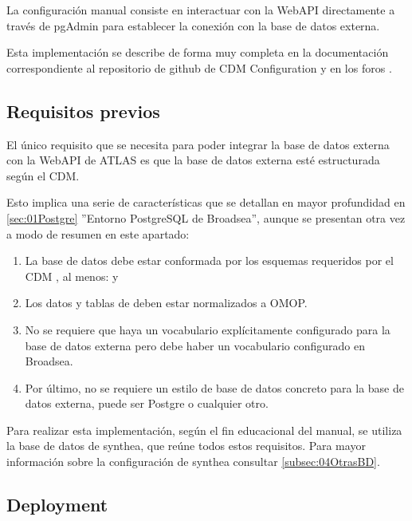 La configuración manual consiste en interactuar con la WebAPI directamente a través de pgAdmin para establecer la conexión con la base de datos externa. 

Esta implementación se describe de forma muy completa en la documentación correspondiente al repositorio de github de CDM Configuration \parencite{githubCDMConfig} y en los foros \parencite{forumAddMSDB}\parencite{forumBroadQuickStart}.

\subsection{Requisitos previos} \label{subsec:04RequisitosPrevios}

El único requisito que se necesita para poder integrar la base de datos externa con la WebAPI de ATLAS es que la base de datos externa esté estructurada según el CDM.

Esto implica una serie de características que se detallan en mayor profundidad en \ref{sec:01Postgre} ''Entorno PostgreSQL de Broadsea'', aunque se presentan otra vez a modo de resumen en este apartado:

\begin{enumerate}
    \item La base de datos debe estar conformada por los esquemas requeridos por el CDM \parencite{githubCDMConfig}, al menos:  y 
    \item Los datos y tablas de  deben estar normalizados a OMOP.
    \item No se requiere que haya un vocabulario explícitamente configurado para la base de datos externa pero debe haber un vocabulario configurado en Broadsea.
    \item Por último, no se requiere un estilo de base de datos concreto para la base de datos externa, puede ser Postgre o cualquier otro. 
    
\end{enumerate}

Para realizar esta implementación, según el fin educacional del manual, se utiliza la base de datos de synthea, que reúne todos estos requisitos. Para mayor información sobre la configuración de synthea consultar \ref{subsec:04OtrasBD}.

\subsection{Deployment} \label{subsec:04deployment}


